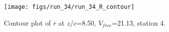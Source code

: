 \begin{figure}[H]
\centering
\texttt{[image: figs/run\_34/run\_34\_R\_contour]}
\caption{Contour plot of $\overline{r}$ at $z/c$=8.50, $V_{free}$=21.13, station 4.}
\label{fig:run_34_R_contour}
\end{figure}



